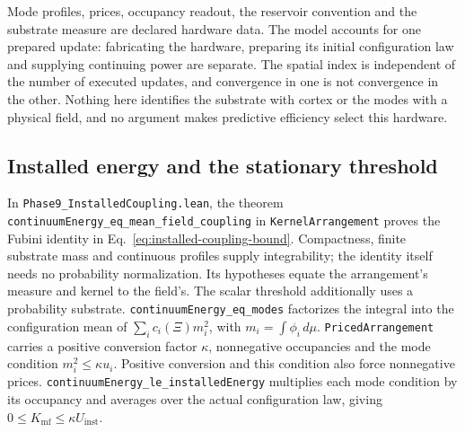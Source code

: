 \documentclass{article}
\begin{document}
Mode profiles, prices, occupancy readout, the reservoir convention and the
substrate measure are declared hardware data. The model accounts for one
prepared update: fabricating the hardware, preparing its initial configuration
law and supplying continuing power are separate. The spatial index is
independent of the number of executed updates, and convergence in one is not
convergence in the other. Nothing here identifies the substrate with cortex or
the modes with a physical field, and no argument makes predictive efficiency
select this hardware.

\subsection{Installed energy and the stationary threshold}
\label{sec:supp-installed}
In \nolinkurl{Phase9_InstalledCoupling.lean}, the theorem
\nolinkurl{continuumEnergy_eq_mean_field_coupling}
in \texttt{KernelArrangement} proves the Fubini identity in
Eq.~\eqref{eq:installed-coupling-bound}. Compactness, finite substrate mass and
continuous profiles supply integrability; the identity itself needs no
probability normalization. Its hypotheses equate the arrangement's measure
and kernel to the field's. The scalar threshold additionally uses a probability
substrate. \nolinkurl{continuumEnergy_eq_modes}
factorizes the integral into the configuration mean of
$\sum_i c_i(\Xi)m_i^2$, with $m_i=\int\phi_i\,d\mu$.
\texttt{PricedArrangement} carries a positive conversion factor $\kappa$,
nonnegative occupancies and the mode condition $m_i^2\leq\kappa u_i$.
Positive conversion and this condition also force nonnegative prices.
\nolinkurl{continuumEnergy_le_installedEnergy}
multiplies each mode condition by its occupancy and averages over the actual
configuration law, giving $0\leq K_{\mathrm{mf}}\leq\kappa U_{\mathrm{inst}}$.
\end{document}
